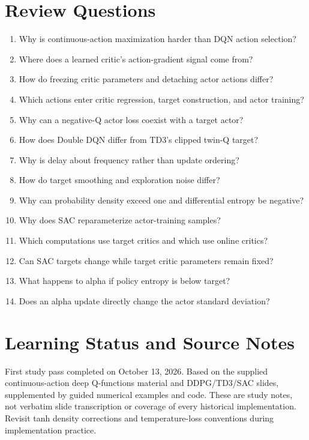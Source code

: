 \section{Review Questions}
\begin{enumerate}
\item Why is continuous-action maximization harder than DQN action selection?
\item Where does a learned critic's action-gradient signal come from?
\item How do freezing critic parameters and detaching actor actions differ?
\item Which actions enter critic regression, target construction, and actor training?
\item Why can a negative-Q actor loss coexist with a target actor?
\item How does Double DQN differ from TD3's clipped twin-Q target?
\item Why is delay about frequency rather than update ordering?
\item How do target smoothing and exploration noise differ?
\item Why can probability density exceed one and differential entropy be negative?
\item Why does SAC reparameterize actor-training samples?
\item Which computations use target critics and which use online critics?
\item Can SAC targets change while target critic parameters remain fixed?
\item What happens to alpha if policy entropy is below target?
\item Does an alpha update directly change the actor standard deviation?
\end{enumerate}

\section{Learning Status and Source Notes}
First study pass completed on October 13, 2026.
Based on the supplied continuous-action deep Q-functions material
and DDPG/TD3/SAC slides, supplemented by guided numerical examples
and code. These are study notes, not verbatim slide transcription
or coverage of every historical implementation.
Revisit tanh density corrections and temperature-loss conventions
during implementation practice.
